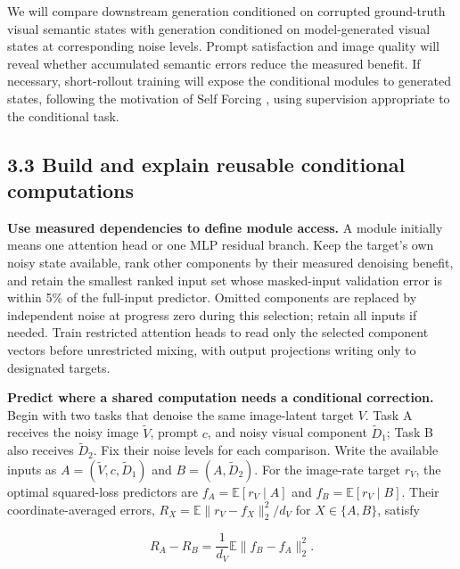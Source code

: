 \documentclass[11pt,letterpaper]{article}
\begin{document}
We will compare downstream generation conditioned on corrupted ground-truth visual semantic states with generation conditioned on model-generated visual states at corresponding noise levels. Prompt satisfaction and image quality will reveal whether accumulated semantic errors reduce the measured benefit. If necessary, short-rollout training will expose the conditional modules to generated states, following the motivation of Self Forcing \citep{selfforcing}, using supervision appropriate to the conditional task.

\hypertarget{build-and-explain-reusable-conditional-computations}{%
\subsection{3.3 Build and explain reusable conditional computations}\label{build-and-explain-reusable-conditional-computations}}

\textbf{Use measured dependencies to define module access.} A module initially means one attention head or one MLP residual branch. Keep the target's own noisy state available, rank other components by their measured denoising benefit, and retain the smallest ranked input set whose masked-input validation error is within 5\% of the full-input predictor. Omitted components are replaced by independent noise at progress zero during this selection; retain all inputs if needed. Train restricted attention heads to read only the selected component vectors before unrestricted mixing, with output projections writing only to designated targets.

\textbf{Predict where a shared computation needs a conditional correction.} Begin with two tasks that denoise the same image-latent target \(V\). Task A receives the noisy image \(\widetilde V\), prompt \(c\), and noisy visual component \(\widetilde D_1\); Task B also receives \(\widetilde D_2\). Fix their noise levels for each comparison. Write the available inputs as \(A=(\widetilde V,c,\widetilde D_1)\) and \(B=(A,\widetilde D_2)\). For the image-rate target \(r_V\), the optimal squared-loss predictors are \(f_A=\mathbb E[r_V\mid A]\) and \(f_B=\mathbb E[r_V\mid B]\). Their coordinate-averaged errors, \(R_X=\mathbb E\|r_V-f_X\|_2^2/d_V\) for \(X\in\{A,B\}\), satisfy

\[
R_A-R_B=\frac{1}{d_V}\mathbb E\|f_B-f_A\|_2^2.
\]
\end{document}
